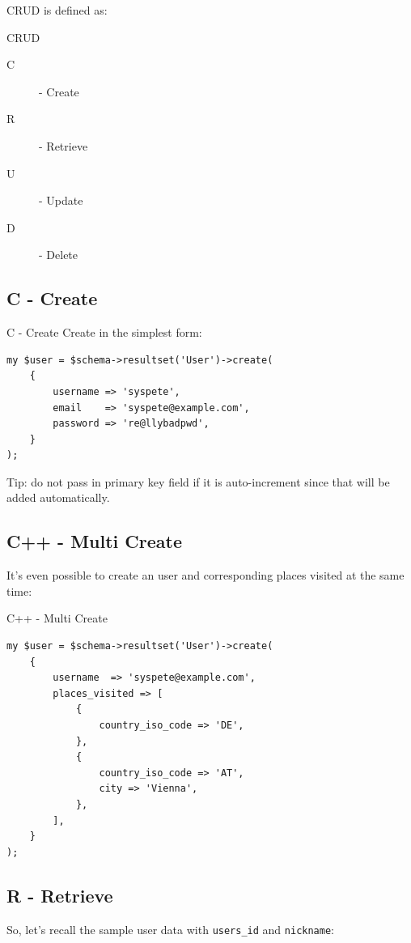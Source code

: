 CRUD is defined as:

\begin{frame}{CRUD}
\begin{description}
\item[C] - Create
\item[R] - Retrieve
\item[U] - Update
\item[D] - Delete
\end{description}
\end{frame}

\subsection{C - Create}
\begin{frame}[fragile]{C - Create}
Create in the simplest form:

\begin{lstlisting}
my $user = $schema->resultset('User')->create(
    {
        username => 'syspete',
        email    => 'syspete@example.com',
        password => 're@llybadpwd',
    }
);
\end{lstlisting}
\end{frame}

Tip: do not pass in primary key field if it is auto-increment since that will be added automatically.

\subsection{C++ - Multi Create}
It's even possible to create an user and corresponding places visited at the
same time:

\begin{frame}[fragile]{C++ - Multi Create}
\begin{lstlisting}
my $user = $schema->resultset('User')->create(
    {
        username  => 'syspete@example.com',
        places_visited => [
            {
                country_iso_code => 'DE',
            },
            {
                country_iso_code => 'AT',
                city => 'Vienna',
            },
        ],
    }
);
\end{lstlisting}
\end{frame}

\subsection{R - Retrieve}

So, let's recall the sample user data with
\verb|users_id| and \verb|nickname|:

